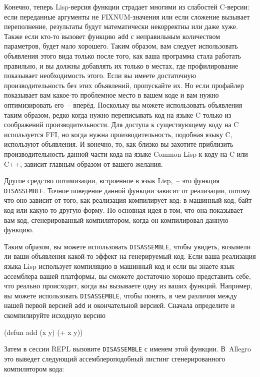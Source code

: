 Конечно, теперь Lisp-версия функции страдает многими из слабостей C-версии: если
переданные аргументы не FIXNUM-значения или если сложение вызывает переполнение,
результаты будут математически некорректны или даже хуже. Также если кто-то вызовет
функцию \lstinline{add} с неправильным количеством параметров, будет мало хорошего. Таким
образом, вам следует использовать объявления этого вида только после того, как ваша
программа стала работать правильно, и вы должны добавлять их только в местах, где
профилирование показывает необходимость этого. Если вы имеете достаточную
производительность без этих объявлений, пропускайте их. Но если профайлер показывает вам
какое-то проблемное место в вашем коде и вам нужно оптимизировать его~-- вперёд. Поскольку
вы можете использовать объявления таким образом, редко ког\-да нужно переписывать код на
языке C только из соображений производительности. Для доступа к существующему коду на C
используется FFI, но когда нужна производительность, подобная языку C, используют
объявления. И конечно, то, как близко вы захотите приблизить производительность данной
части кода на языке Common Lisp к коду на C или C++, зависит главным образом от вашего
желания.

Другое средство оптимизации, встроенное в язык Lisp,~-- это функция
\lstinline{DISASSEMBLE}. Точное поведение данной функции зависит от реализации, потому что оно
зависит от того, как реализация компилирует код: в машинный код, байт-код или какую-то
другую форму. Но основная идея в том, что она показывает вам код, сгенерированный
компилятором, когда он компилировал данную функцию.

Таким образом, вы можете использовать \lstinline{DISASSEMBLE}, чтобы увидеть, возымели ли ваши
объявления какой-то эффект на генерируемый код. Если ваша реализация языка Lisp использует
компиляцию в машинный код и если вы знаете язык ассемблера вашей платформы, вы сможете
достаточно хорошо представить себе, что реально происходит, когда вы вызываете одну из
ваших функций. Например, вы можете использовать \lstinline{DISASSEMBLE}, чтобы понять, в чем
различия между нашей первой версией \lstinline{add} и окончательной версией. Сначала определите
и скомпилируйте исходную версию

\begin{myverb}
(defun add (x y) (+ x y))
\end{myverb}

Затем в сессии REPL вызовите \lstinline{DISASSEMBLE} с именем этой функции. В~Allegro это
выведет следующий ассемблероподобный листинг сгенерированного компилятором кода:

